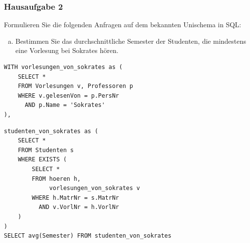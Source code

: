 \begin{frame}[fragile]
	\frametitle{Hausaufgabe 2}
	\vspace{0.5cm}

	\begin{multicols}{2}
		Formulieren Sie die folgenden Anfragen auf dem bekannten Unischema in SQL:
		\begin{enumerate}[a)]
			\item Bestimmen Sie das durchschnittliche Semester der Studenten, die mindestens eine Vorlesung bei Sokrates hören.
		\end{enumerate}
		\begin{verbatim}
WITH vorlesungen_von_sokrates as (
	SELECT * 
	FROM Vorlesungen v, Professoren p
	WHERE v.gelesenVon = p.PersNr
	  AND p.Name = 'Sokrates'
),
		\end{verbatim}
		\vfill\columnbreak

		\begin{verbatim}
studenten_von_sokrates as (
	SELECT * 
	FROM Studenten s
	WHERE EXISTS (
		SELECT *
		FROM hoeren h, 
		     vorlesungen_von_sokrates v
		WHERE h.MatrNr = s.MatrNr
		  AND v.VorlNr = h.VorlNr
	)
)
SELECT avg(Semester) FROM studenten_von_sokrates
		\end{verbatim}
	\end{multicols}
\end{frame}

